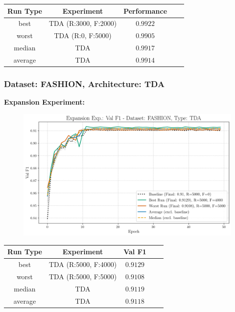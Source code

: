 \begin{table}[H]
	\centering
	\vspace{-1em}
	\begin{tabular}{|c|c|c|c|c|}
		\hline
		Run Type & Experiment & Performance \\ \hline
		best & TDA (R:3000, F:2000) & $0.9922$\\ \hline
		worst & TDA (R:0, F:5000) & $0.9905$\\ \hline
		median & TDA & $0.9917$\\ \hline
		average & TDA & $0.9914$
		\\ \hline
	\end{tabular}
\end{table}
\newpage
\subsubsection{Dataset: FASHION, Architecture: TDA}
\noindent\textbf{Expansion Experiment:}
\begin{figure}[htbp]
	\centering
	\includegraphics[width=.85\textwidth]{abb/strat_classifier_performance/tda_fashion_mnist/expansion_experiments/val_f1_score_tda_fashion_mnist_fashion_all.png}
	\label{fig:app_strat_class_performance_expansion_exp._val_f1_score_}
\end{figure}
\begin{table}[H]
	\centering
	\vspace{-1em}
	\begin{tabular}{|c|c|c|c|c|}
		\hline
		Run Type & Experiment & Val F1 \\ \hline
		best & TDA (R:5000, F:4000) & $0.9129$\\ \hline
		worst & TDA (R:5000, F:5000) & $0.9108$\\ \hline
		median & TDA & $0.9119$\\ \hline
		average & TDA & $0.9118$
		\\ \hline
	\end{tabular}
\end{table}
